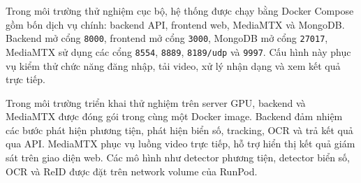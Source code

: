 \documentclass[../DoAn.tex]{subfiles}
\begin{document}
Trong môi trường thử nghiệm cục bộ, hệ thống được chạy bằng Docker Compose gồm bốn dịch vụ chính: backend API, frontend web, MediaMTX và MongoDB. Backend mở cổng \texttt{8000}, frontend mở cổng \texttt{3000}, MongoDB mở cổng \texttt{27017}, MediaMTX sử dụng các cổng \texttt{8554}, \texttt{8889}, \texttt{8189/udp} và \texttt{9997}. Cấu hình này phục vụ kiểm thử chức năng đăng nhập, tải video, xử lý nhận dạng và xem kết quả trực tiếp.

Trong môi trường triển khai thử nghiệm trên server GPU, backend và MediaMTX được đóng gói trong cùng một Docker image. Backend đảm nhiệm các bước phát hiện phương tiện, phát hiện biển số, tracking, OCR và trả kết quả qua API. MediaMTX phục vụ luồng video trực tiếp, hỗ trợ hiển thị kết quả giám sát trên giao diện web. Các mô hình như detector phương tiện, detector biển số, OCR và ReID được đặt trên network volume của RunPod.
\end{document}
